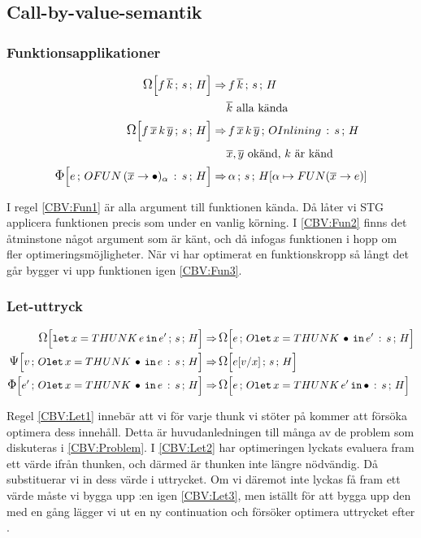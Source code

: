 \documentclass[../Optimise]{subfiles}
\begin{document}

\subsection{Call-by-value-semantik}
\label{sec:Optimise:CBV}

\subsubsection{Funktionsapplikationer}

\begin{align}
\label{CBV:Fun1} \OMEGA sH{f\,\many{k}}  \Rightarrow &\, \mc{f\,\many{k}}sH\\
 & \many{k} \text{ alla kända} \nonumber \\
\label{CBV:Fun2} \OMEGA sH{f\,\many{x}\, k\,\many{y}}  \Rightarrow &\, \mc{f\,\many{x}\, k\,\many{y}}{\oInline s}H\\
 & \many{x},\many{y} \text{ okänd, } k \text{ är känd} \nonumber \\
\label{CBV:Fun3} \IRR{\cOFUN{\many{x}}{\alpha}s}He  \Rightarrow &\, \mc{\alpha}s{\heap{\alpha}{\FUN{\many{x}}e}}
\end{align}

I regel \eqref{CBV:Fun1} är alla argument till funktionen kända. Då låter vi STG 
applicera funktionen precis som under en vanlig körning. I \eqref{CBV:Fun2} finns det 
åtminstone något argument som är känt, och då infogas funktionen i hopp om
fler optimeringsmöjligheter.
När vi har optimerat en funktionskropp så långt det går bygger vi upp funktionen igen \eqref{CBV:Fun3}.


\subsubsection{Let-uttryck}

\begin{align}
\label{CBV:Let1} \OMEGA sH{\eLet x{\THUNK e}{e'}}  \Rightarrow &\, \OMEGA{\oLet x{e'}s}He\\
\label{CBV:Let2} \PSI{\oLet xes}Hv  \Rightarrow &\, \OMEGA sH{e[v/x]} \\
\label{CBV:Let3} \IRR{\oLet xes}H{e'}  \Rightarrow &\, \OMEGA{\oLetObj x{\THUNK{e'}}s}He
\end{align}

Regel \eqref{CBV:Let1} innebär att vi för varje thunk vi stöter på kommer att försöka optimera
dess innehåll. Detta är huvudanledningen till många av de problem som diskuteras i \ref{CBV:Problem}.
I \eqref{CBV:Let2} har optimeringen lyckats evaluera fram ett värde ifrån thunken, och
därmed är thunken inte längre nödvändig. Då substituerar vi in dess värde i uttrycket. 
Om vi däremot inte lyckas få fram ett värde måste vi bygga upp :en igen \eqref{CBV:Let3}, 
men iställt för att bygga upp den med en gång lägger vi ut en ny continuation och 
försöker optimera uttrycket efter .
\end{document}
